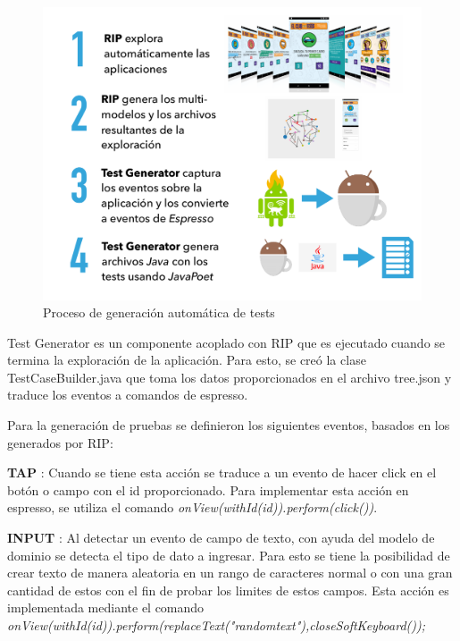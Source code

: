 \begin{figure}[h]
	\centering
	\includegraphics[width=1\textwidth]{img/procesoTests.pdf}
	\vspace{-0.5cm}
	\caption{Proceso de generación automática de tests}
	\label{procesoTests}
\end{figure} 

Test Generator es un componente acoplado con RIP que es ejecutado cuando se termina la exploración de la aplicación. Para esto, se creó la clase TestCaseBuilder.java que toma los datos proporcionados en el archivo tree.json y traduce los eventos a comandos de espresso.


Para la generación de pruebas se definieron los siguientes eventos, basados en los generados por RIP:

\textbf{TAP} : Cuando se tiene esta acción se traduce a un evento de hacer click en el botón o campo con el id proporcionado. Para implementar esta acción en espresso, se utiliza el comando \textit{onView(withId(id)).perform(click())}.

\textbf{INPUT} :  Al detectar un evento de campo de texto, con ayuda del modelo de dominio se detecta el tipo de dato a ingresar. Para esto se tiene la posibilidad de crear texto de manera aleatoria en un rango de caracteres normal o con una gran cantidad de estos con el fin de probar los limites de estos campos. Esta acción es implementada mediante el comando \textit{onView(withId(id)).perform(replaceText("randomtext"),closeSoftKeyboard());}



